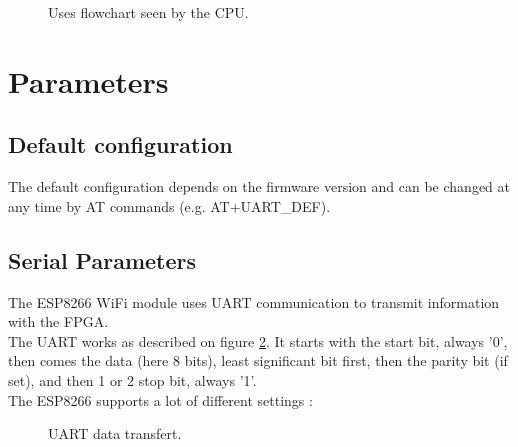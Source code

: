 \documentclass[11pt]{article}
\begin{document}
\begin{figure}[H]
        \caption{Uses flowchart seen by the CPU.}
        \label{uses_flowchart}
\end{figure}
\newpage
\section{Parameters}
\subsection{Default configuration}
The default configuration depends on the firmware version and can be changed at any time by AT commands (e.g. AT+UART_DEF).

\subsection{Serial Parameters}
The ESP8266 WiFi module uses UART communication to transmit information with the FPGA.\\
The UART works as described on figure \ref{UART_data_transfert}. It starts with the start bit, always '0', then comes the data (here 8 bits), least significant bit first, then the parity bit (if set), and then 1 or 2 stop bit, always '1'.\\
The ESP8266 supports a lot of different settings :
\begin{figure}[H]
        \caption{UART data transfert.}
        \label{UART_data_transfert}
\end{figure}
\end{document}
